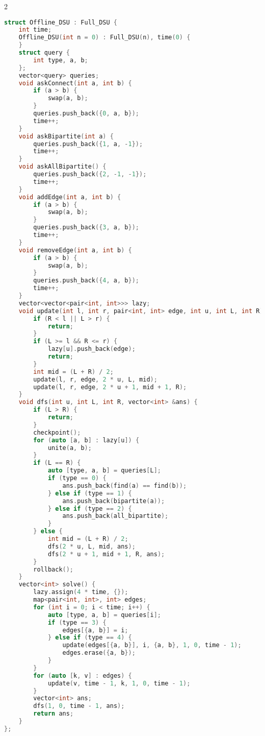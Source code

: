\documentclass[11pt, a4paper, oneside]{book}
\begin{document}
\begin{multicols}{2}
\begin{lstlisting}[language=C++]
struct Offline_DSU : Full_DSU {
    int time;
    Offline_DSU(int n = 0) : Full_DSU(n), time(0) {
    }
    struct query {
        int type, a, b;
    };
    vector<query> queries;
    void askConnect(int a, int b) {
        if (a > b) {
            swap(a, b);
        }
        queries.push_back({0, a, b});
        time++;
    }
    void askBipartite(int a) {
        queries.push_back({1, a, -1});
        time++;
    }
    void askAllBipartite() {
        queries.push_back({2, -1, -1});
        time++;
    }
    void addEdge(int a, int b) {
        if (a > b) {
            swap(a, b);
        }
        queries.push_back({3, a, b});
        time++;
    }
    void removeEdge(int a, int b) {
        if (a > b) {
            swap(a, b);
        }
        queries.push_back({4, a, b});
        time++;
    }
    vector<vector<pair<int, int>>> lazy;
    void update(int l, int r, pair<int, int> edge, int u, int L, int R) {
        if (R < l || L > r) {
            return;
        }
        if (L >= l && R <= r) {
            lazy[u].push_back(edge);
            return;
        }
        int mid = (L + R) / 2;
        update(l, r, edge, 2 * u, L, mid);
        update(l, r, edge, 2 * u + 1, mid + 1, R);
    }
    void dfs(int u, int L, int R, vector<int> &ans) {
        if (L > R) {
            return;
        }
        checkpoint();
        for (auto [a, b] : lazy[u]) {
            unite(a, b);
        }
        if (L == R) {
            auto [type, a, b] = queries[L];
            if (type == 0) {
                ans.push_back(find(a) == find(b));
            } else if (type == 1) {
                ans.push_back(bipartite(a));
            } else if (type == 2) {
                ans.push_back(all_bipartite);
            }
        } else {
            int mid = (L + R) / 2;
            dfs(2 * u, L, mid, ans);
            dfs(2 * u + 1, mid + 1, R, ans);
        }
        rollback();
    }
    vector<int> solve() {
        lazy.assign(4 * time, {});
        map<pair<int, int>, int> edges;
        for (int i = 0; i < time; i++) {
            auto [type, a, b] = queries[i];
            if (type == 3) {
                edges[{a, b}] = i;
            } else if (type == 4) {
                update(edges[{a, b}], i, {a, b}, 1, 0, time - 1);
                edges.erase({a, b});
            }
        }
        for (auto [k, v] : edges) {
            update(v, time - 1, k, 1, 0, time - 1);
        }
        vector<int> ans;
        dfs(1, 0, time - 1, ans);
        return ans;
    }
};\end{lstlisting}
\end{multicols}
\end{document}
